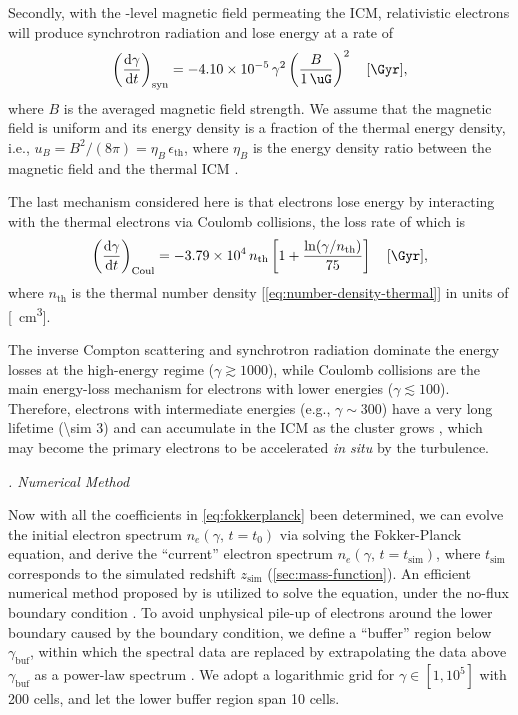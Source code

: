 \documentclass[modern]{aastex62}
\newcommand{\R}[1]{\mathrm{#1}}
\newcommand{\D}[1]{\R{d} #1}
\newcommand{\diff}[2]{\frac{\D{#1}}{\D{#2}}}
\newcounter{sssseccount}
\newcommand{\sssseclabel}{\alph{sssseccount}}
\newcommand{\ssssec}[1]{%
  \vspace{1ex}%
  \stepcounter{sssseccount}%
  \noindent\emph{\sssseclabel. #1}%
}
\begin{document}
Secondly, with the \si{\uG}-level magnetic field permeating the ICM,
relativistic electrons will produce synchrotron radiation and lose
energy at a rate of
\begin{equation}
  \label{eq:eloss-syn}
  \left( \diff{\gamma}{t} \right)_{\R{syn}} =
    \num{-4.10e-5} \,\gamma^2 \left( \frac{B}{\SI{1}{\uG}} \right)^2
    \quad [\si{\per\Gyr}],
\end{equation}
where $B$ is the averaged magnetic field strength.
We assume that the magnetic field is uniform and its energy density
is a fraction of the thermal energy density, i.e.,
$u_B = B^2 / (8\pi) = \eta_B \,\epsilon_{\R{th}}$,
where $\eta_B$ is the energy density ratio between the magnetic field
and the thermal ICM \citep[e.g.,][]{bohringer2016}.

The last mechanism considered here is that electrons lose energy by
interacting with the thermal electrons via Coulomb collisions, the
loss rate of which is
\begin{equation}
  \label{eq:eloss-coul}
  \left( \diff{\gamma}{t} \right)_{\R{Coul}} =
  \num{-3.79e4} \,n_{\R{th}} \left[ 1 +
    \frac{\ln(\gamma/n_{\R{th}})}{75} \right] \quad [\si{\per\Gyr}],
\end{equation}
where $n_{\R{th}}$ is the thermal number density
[\autoref{eq:number-density-thermal}] in units of [\si{\per\cm\cubed}].

The inverse Compton scattering and synchrotron radiation dominate
the energy losses at the high-energy regime ($\gamma \gtrsim 1000$),
while Coulomb collisions are the main energy-loss mechanism for electrons
with lower energies ($\gamma \lesssim 100$).
Therefore, electrons with intermediate energies (e.g., $\gamma \sim 300$)
have a very long lifetime (\SI{\sim 3}{\Gyr}) and can accumulate in the
ICM as the cluster grows \citep{sarazin1999}, which may become the primary
electrons to be accelerated \textit{in situ} by the turbulence.

\ssssec{Numerical Method}

Now with all the coefficients in \autoref{eq:fokkerplanck} been determined,
we can evolve the initial electron spectrum $n_e(\gamma,\, t=t_0)$ via
solving the Fokker-Planck equation, and derive the \enquote{current}
electron spectrum $n_e(\gamma,\, t=t_{\R{sim}})$,
where $t_{\R{sim}}$ corresponds to the simulated redshift $z_{\R{sim}}$
(\autoref{sec:mass-function}).
An efficient numerical method proposed by \citet{chang1970} is utilized
to solve the equation, under the no-flux boundary condition \citep{park1996}.
To avoid unphysical pile-up of electrons around the lower boundary caused
by the boundary condition,
we define a \enquote{buffer} region below $\gamma_{\R{buf}}$, within which
the spectral data are replaced by extrapolating the data above
$\gamma_{\R{buf}}$ as a power-law spectrum \citep{donnert2014}.
We adopt a logarithmic grid for $\gamma \in [1, 10^5]$ with 200 cells,
and let the lower buffer region span 10 cells.
\end{document}
